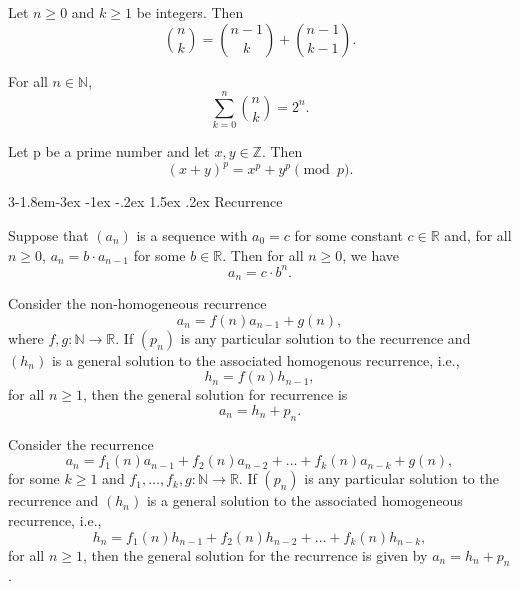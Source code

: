 \documentclass{tufte-handout}
\makeatletter
\renewcommand{\subsection}{\@startsection{subsection}%
    {3}{-1.8em}{-3ex \@plus -1ex \@minus -.2ex}%
    {1.5ex \@plus .2ex}
    {\hspace*{-5.5em}\fcolorbox{ltblue}{ltblue}{\parbox[c][1.0ex][b]{4em}{\phantom{space}}}
    \normalfont\large\itshape\color{ltblue}}}
\makeatother
\begin{document}
\begin{Proposition}
    Let \( n \geq 0 \) and \( k\geq 1 \) be integers. Then
    \[\binom{n}{k} = \binom{n-1}{k} + \binom{n-1}{k-1}.\]
\end{Proposition}

\begin{Proposition}
    For all \( n \in \mathbb{N} \),
    \[\sum_{k=0}^{n}\binom{n}{k} = 2^n.\]
\end{Proposition}

\begin{Theorem}
    Let p be a prime number and let \( x,y \in \mathbb{Z}\).
    Then 
    \[(x+y)^p=x^p + y^p \pmod{p}.\]
\end{Theorem}


\subsection{Recurrence}
\begin{Proposition}
    Suppose that \( (a_n)\) is a sequence with \( a_0=c \)
    for some constant \( c \in \mathbb{R} \) and, for all \( n \geq 0 \),
    \( a_n=b\cdot a_{n-1} \) for some \( b \in \mathbb{R} \). Then for all \( n \geq 0 \),
    we have
    \[ a_n = c\cdot b^n.\]
\end{Proposition}

\begin{Theorem}
    Consider the non-homogeneous recurrence
    \[ a_n = f(n)a_{n-1} + g(n),\]
    where \( f,g: \mathbb{N} \to \mathbb{R} \). If \( (p_n) \) is 
    any particular solution to the recurrence and \( (h_n) \) is a
    general solution to the associated homogenous recurrence, i.e.,
    \[ h_n = f(n)h_{n-1},\]
    for all \( n \geq 1 \), then the general solution
    for recurrence is
    \[ a_n = h_n + p_n.\]
\end{Theorem}

\begin{Theorem}
    Consider the recurrence
    \[a_n = f_1(n)a_{n-1} + f_2(n)a_{n-2} + \dots +
    f_k(n)a_{n-k} + g(n),\]
    for some \( k \geq 1 \) and \( f_1, \ldots, f_k, g: \mathbb{N} \to \mathbb{R} \).
    If \( (p_n) \) is any particular solution to the recurrence
    and \( (h_n) \) is a general solution to the
    associated homogeneous recurrence, i.e.,
    \[ h_n = f_1(n)h_{n-1} + f_2(n)h_{n-2} + \dots + f_k(n)h_{n-k},\]
    for all \( n \geq 1 \), then the general solution for the recurrence is
    given by \( a_n = h_n + p_n \).
\end{Theorem}
\end{document}
